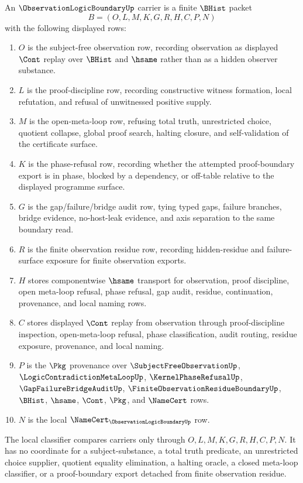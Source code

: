 \begin{definition}
\label{def:observation-logic-boundary-carrier}
An $\ObservationLogicBoundaryUp$ carrier is a finite $\BHist$ packet
$$
B=(O,L,M,K,G,R,H,C,P,N)
$$
with the following displayed rows:
\begin{enumerate}
\item $O$ is the subject-free observation row, recording observation as displayed $\Cont$ replay over $\BHist$ and $\hsame$ rather than as a hidden observer substance.
\item $L$ is the proof-discipline row, recording constructive witness formation, local refutation, and refusal of unwitnessed positive supply.
\item $M$ is the open-meta-loop row, refusing total truth, unrestricted choice, quotient collapse, global proof search, halting closure, and self-validation of the certificate surface.
\item $K$ is the phase-refusal row, recording whether the attempted proof-boundary export is in phase, blocked by a dependency, or off-table relative to the displayed programme surface.
\item $G$ is the gap/failure/bridge audit row, tying typed gaps, failure branches, bridge evidence, no-host-leak evidence, and axis separation to the same boundary read.
\item $R$ is the finite observation residue row, recording hidden-residue and failure-surface exposure for finite observation exports.
\item $H$ stores componentwise $\hsame$ transport for observation, proof discipline, open meta-loop refusal, phase refusal, gap audit, residue, continuation, provenance, and local naming rows.
\item $C$ stores displayed $\Cont$ replay from observation through proof-discipline inspection, open-meta-loop refusal, phase classification, audit routing, residue exposure, provenance, and local naming.
\item $P$ is the $\Pkg$ provenance over $\SubjectFreeObservationUp$, $\LogicContradictionMetaLoopUp$, $\KernelPhaseRefusalUp$, $\GapFailureBridgeAuditUp$, $\FiniteObservationResidueBoundaryUp$, $\BHist$, $\hsame$, $\Cont$, $\Pkg$, and $\NameCert$ rows.
\item $N$ is the local $\NameCert_{\ObservationLogicBoundaryUp}$ row.
\end{enumerate}
The local classifier compares carriers only through $O,L,M,K,G,R,H,C,P,N$. It has no coordinate for a subject-substance, a total truth predicate, an unrestricted choice supplier, quotient equality elimination, a halting oracle, a closed meta-loop classifier, or a proof-boundary export detached from finite observation residue.
\end{definition}

